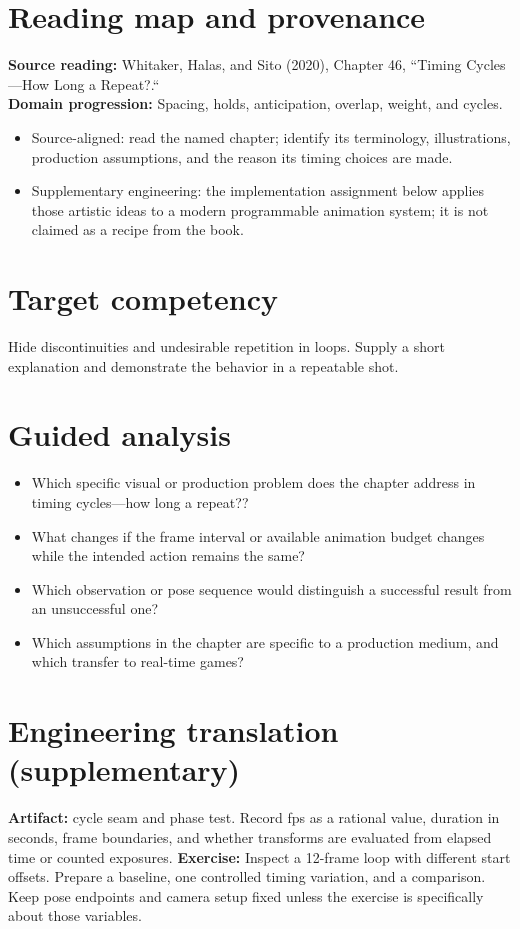 \documentclass[10pt,letterpaper]{article}
\begin{document}
\makedoctitle
\makedocsummary

\section{Reading map and provenance}
\textbf{Source reading:} Whitaker, Halas, and Sito (2020), Chapter 46, ``Timing Cycles—How Long a Repeat?.``\\
\textbf{Domain progression:} Spacing, holds, anticipation, overlap, weight, and cycles.
\begin{itemize}
\item Source-aligned: read the named chapter; identify its terminology, illustrations, production assumptions, and the reason its timing choices are made.
\item Supplementary engineering: the implementation assignment below applies those artistic ideas to a modern programmable animation system; it is not claimed as a recipe from the book.
\end{itemize}
\section{Target competency}
Hide discontinuities and undesirable repetition in loops. Supply a short explanation and demonstrate the behavior in a repeatable shot.
\section{Guided analysis}
\begin{itemize}
\item Which specific visual or production problem does the chapter address in timing cycles—how long a repeat??
\item What changes if the frame interval or available animation budget changes while the intended action remains the same?
\item Which observation or pose sequence would distinguish a successful result from an unsuccessful one?
\item Which assumptions in the chapter are specific to a production medium, and which transfer to real-time games?
\end{itemize}
\section{Engineering translation (supplementary)}
\textbf{Artifact:} cycle seam and phase test. Record fps as a rational value, duration in seconds, frame boundaries, and whether transforms are evaluated from elapsed time or counted exposures.
\textbf{Exercise:} Inspect a 12-frame loop with different start offsets. Prepare a baseline, one controlled timing variation, and a comparison. Keep pose endpoints and camera setup fixed unless the exercise is specifically about those variables.
\end{document}
